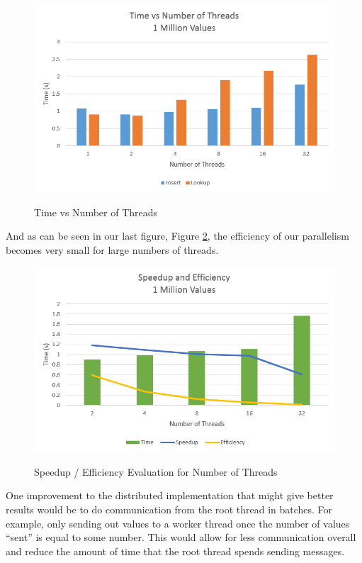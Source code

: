 \documentclass{article}
\begin{document}
\begin{figure}[H]
  \caption{Time vs Number of Threads}
  \centering
  \includegraphics[width=\textwidth]{dist_2}
    \label{fig:dist_2}
\end{figure}

And as can be seen in our last figure, Figure \ref{fig:dist_3}, the efficiency of our parallelism becomes very small for large numbers of threads.
\begin{figure}[H]
  \caption{Speedup / Efficiency Evaluation for Number of Threads}
  \centering
  \includegraphics[width=\textwidth]{dist_3}
    \label{fig:dist_3}
\end{figure}


One improvement to the distributed implementation that might give better results would be to do communication from the root thread in batches. For example, only sending out values to a worker thread once the number of values ``sent'' is equal to some number. This would allow for less communication overall and reduce the amount of time that the root thread spends sending messages.
\end{document}
